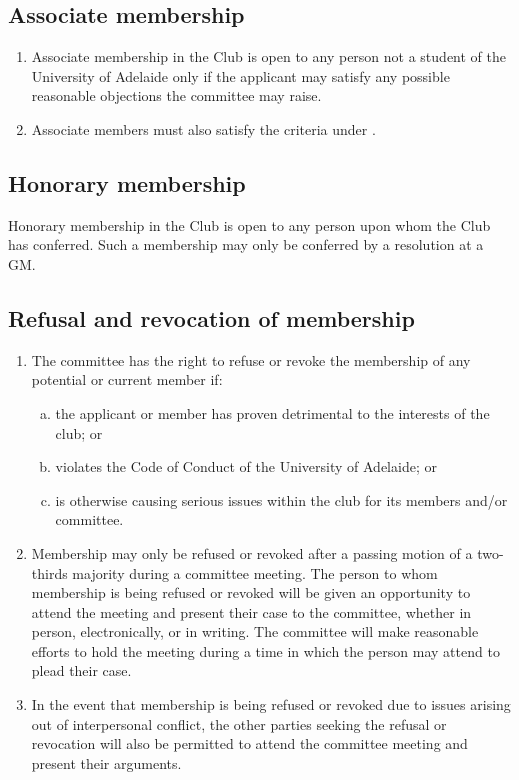 \documentclass{constitution}
\begin{document}
\subsection{Associate membership}\label{associateMembership}
\begin{enumerate}[(1)]
    \item Associate membership in the Club is open to any person not a student of the University of Adelaide only if the applicant may satisfy any possible reasonable objections the committee may raise.
    \item Associate members must also satisfy the criteria under .
\end{enumerate}

\subsection{Honorary membership}\label{honoraryMembership}
Honorary membership in the Club is open to any person upon whom the Club has conferred. Such a membership may only be conferred by a resolution at a GM.

\subsection{Refusal and revocation of membership}\label{refusalRevocationMembership}
\begin{enumerate}[(1)]
    \item The committee has the right to refuse or revoke the membership of any potential or current member if:
          \begin{enumerate}[(a)]
              \item the applicant or member has proven detrimental to the interests of the club; or
              \item violates the Code of Conduct of the University of Adelaide; or
              \item is otherwise causing serious issues within the club for its members and/or committee.
          \end{enumerate}
    \item Membership may only be refused or revoked after a passing motion of a two-thirds majority during a committee meeting. The person to whom membership is being refused or revoked will be given an opportunity to attend the meeting and present their case to the committee, whether in person, electronically, or in writing. The committee will make reasonable efforts to hold the meeting during a time in which the person may attend to plead their case.
    \item In the event that membership is being refused or revoked due to issues arising out of interpersonal conflict, the other parties seeking the refusal or revocation will also be permitted to attend the committee meeting and present their arguments.
\end{enumerate}
\end{document}
